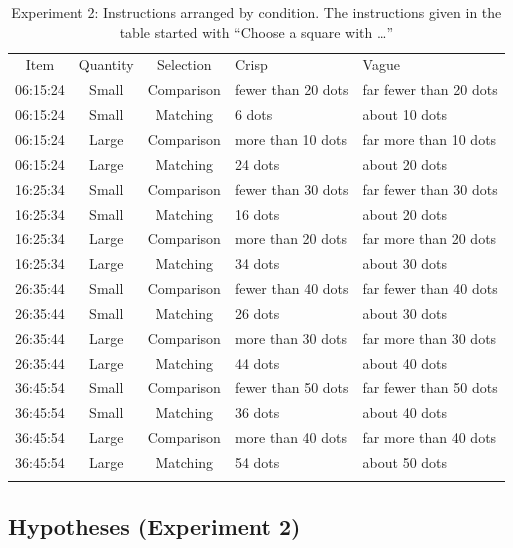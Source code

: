 \begin{table}
\centering
\caption{Experiment 2: Instructions arranged by condition. The instructions given in the table started with ``Choose a square with \ldots''}
\label{Instructions for e2}
\begin{tabular}{cccll}
\hline\noalign{\smallskip}
Item & Quantity & Selection & Crisp & Vague \\ 
\noalign{\smallskip}\hline\noalign{\smallskip}
06:15:24 & Small & Comparison & fewer than 20 dots & far fewer than 20 dots \\ 
06:15:24 & Small & Matching & 6 dots & about 10 dots \\ 
06:15:24 & Large & Comparison & more than 10 dots & far more than 10 dots \\ 
06:15:24 & Large & Matching & 24 dots & about 20 dots \\ 
\noalign{\smallskip}\hline\noalign{\smallskip}
16:25:34 & Small & Comparison & fewer than 30 dots & far fewer than 30 dots \\ 
16:25:34 & Small & Matching & 16 dots & about 20 dots \\ 
16:25:34 & Large & Comparison & more than 20 dots & far more than 20 dots \\ 
16:25:34 & Large & Matching & 34 dots & about 30 dots \\ 
\noalign{\smallskip}\hline\noalign{\smallskip}
26:35:44 & Small & Comparison & fewer than 40 dots & far fewer than 40 dots \\ 
26:35:44 & Small & Matching & 26 dots & about 30 dots \\ 
26:35:44 & Large & Comparison & more than 30 dots & far more than 30 dots \\ 
26:35:44 & Large & Matching & 44 dots & about 40 dots \\ 
\noalign{\smallskip}\hline\noalign{\smallskip}
36:45:54 & Small & Comparison & fewer than 50 dots & far fewer than 50 dots \\ 
36:45:54 & Small & Matching & 36 dots & about 40 dots \\ 
36:45:54 & Large & Comparison & more than 40 dots & far more than 40 dots \\ 
36:45:54 & Large & Matching & 54 dots & about 50 dots \\ 
\noalign{\smallskip}\hline
\end{tabular}
\end{table}

\subsection{Hypotheses (Experiment 2)}

